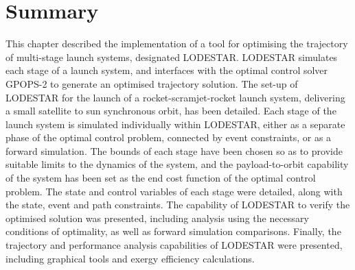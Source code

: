 \section{Summary}
This chapter described the implementation of a tool for optimising the trajectory of multi-stage launch systems, designated LODESTAR. 
LODESTAR simulates each stage of a launch system, and interfaces with the optimal control solver GPOPS-2 to generate an optimised trajectory solution. 
The set-up of LODESTAR for the launch of a rocket-scramjet-rocket launch system, delivering a small satellite to sun synchronous orbit, has been detailed. 
Each stage of the launch system is simulated individually within LODESTAR, either as a separate phase of the optimal control problem, connected by event constraints, or as a forward simulation. 
The bounds of each stage have been chosen so as to provide suitable limits to the dynamics of the system, and the payload-to-orbit capability of the system has been set as the end cost function of the optimal control problem. 
The state and control variables of each stage were detailed, along with the state, event and path constraints.
The capability of LODESTAR to verify the optimised solution was presented, including analysis using the necessary conditions of optimality, as well as forward simulation comparisons.
Finally, the trajectory and performance analysis capabilities of LODESTAR were presented, including graphical tools and exergy efficiency calculations. 
